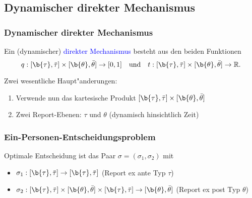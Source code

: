 \subsection{Dynamischer direkter Mechanismus}
\begin{frame}
  \frametitle{Dynamischer direkter Mechanismus}
  \justifying
  \begin{thmD}
    Ein (dynamischer) \textcolor{blue}{direkter Mechanismus} besteht aus den beiden Funktionen
    \begin{equation*}
      q:[ \b{\tau} , \bar{\tau} ] \times [ \b{\theta} , \bar{\theta} ] \rightarrow [0,1]
      \quad \text{und} \quad
      t:[ \b{\tau} , \bar{\tau} ] \times [ \b{\theta} , \bar{\theta} ] \rightarrow \mathbb{R}.
    \end{equation*}
  \end{thmD}
  Zwei wesentliche Haupt"anderungen:
  \begin{enumerate}
    \item Verwende nun das kartesische Produkt $[ \b{\tau} , \bar{\tau} ] \times [ \b{\theta} , \bar{\theta} ]$
    \item Zwei Report-Ebenen: $\tau$ und $\theta$ (dynamisch hinsichtlich Zeit)
  \end{enumerate}
\end{frame}

\begin{frame}
  \frametitle{Ein-Personen-Entscheidungsproblem}
  \justifying
  Optimale Entscheidung ist das Paar $\sigma = (\sigma_{1}, \sigma_{2})$ mit
  \begin{itemize}
    \item $\sigma_{1}: [ \b{\tau} , \bar{\tau} ] \rightarrow [ \b{\tau} , \bar{\tau} ]$ (Report ex ante Typ $\tau$)
    \item $\sigma_{2}: [ \b{\tau} , \bar{\tau} ] \times [ \b{\theta} , \bar{\theta} ]
    \times [ \b{\tau} , \bar{\tau} ]  \rightarrow [ \b{\theta} , \bar{\theta} ]$ (Report ex post Typ $\theta$)
  \end{itemize}
\end{frame}

